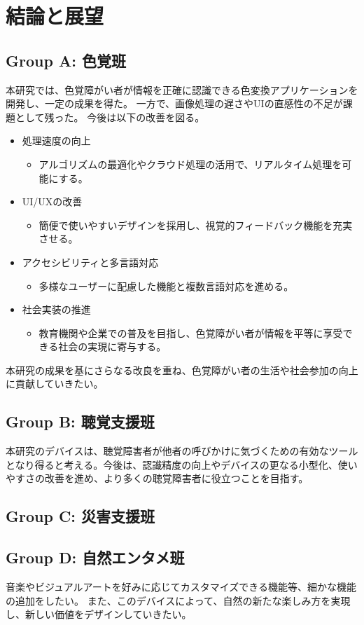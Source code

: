 \section{結論と展望}
\subsection{Group A: 色覚班}
本研究では、色覚障がい者が情報を正確に認識できる色変換アプリケーションを開発し、一定の成果を得た。
一方で、画像処理の遅さやUIの直感性の不足が課題として残った。
今後は以下の改善を図る。
\begin{itemize}
  \item 処理速度の向上
  \begin{itemize}
    \item アルゴリズムの最適化やクラウド処理の活用で、リアルタイム処理を可能にする。
  \end{itemize}
  \item UI/UXの改善
  \begin{itemize}
    \item 簡便で使いやすいデザインを採用し、視覚的フィードバック機能を充実させる。
  \end{itemize}
  \item アクセシビリティと多言語対応
  \begin{itemize}
    \item 多様なユーザーに配慮した機能と複数言語対応を進める。
  \end{itemize}
  \item 社会実装の推進
  \begin{itemize}
    \item 教育機関や企業での普及を目指し、色覚障がい者が情報を平等に享受できる社会の実現に寄与する。
  \end{itemize}
\end{itemize}
  本研究の成果を基にさらなる改良を重ね、色覚障がい者の生活や社会参加の向上に貢献していきたい。

\subsection{Group B: 聴覚支援班}
本研究のデバイスは、聴覚障害者が他者の呼びかけに気づくための有効なツールとなり得ると考える。今後は、認識精度の向上やデバイスの更なる小型化、使いやすさの改善を進め、より多くの聴覚障害者に役立つことを目指す。
\subsection{Group C: 災害支援班}

\subsection{Group D: 自然エンタメ班}
音楽やビジュアルアートを好みに応じてカスタマイズできる機能等、細かな機能の追加をしたい。
また、このデバイスによって、自然の新たな楽しみ方を実現し、新しい価値をデザインしていきたい。
